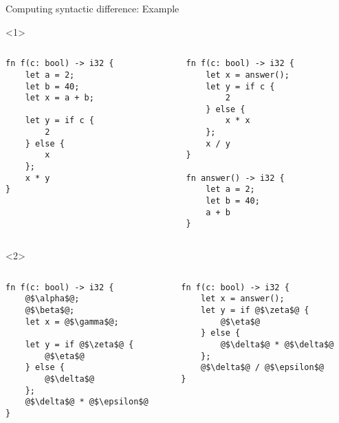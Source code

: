 \documentclass{beamer}
\begin{document}
\begin{frame}[fragile]{Computing syntactic difference: Example}
\newbox\boxsemicolon
\sbox\boxsemicolon{\color{blue}\scriptsize\ttfamily;}

\begin{onlyenv}<1>
\begin{columns}
\begin{column}{0.45\textwidth}
\vspace{0.5em}
\begin{lstlisting}
fn f(c: bool) -> i32 {
    let a = 2;
    let b = 40;
    let x = a + b;

    let y = if c {
        2
    } else {
        x
    };
    x * y
}
\end{lstlisting}
\end{column}
\begin{column}{0.45\textwidth}
\vspace{0.5em}
\begin{lstlisting}[rulecolor=\color{blue!40}]
fn f(c: bool) -> i32 {
    let x = answer();
    let y = if c {
        2
    } else {
        x * x
    };
    x / y
}

fn answer() -> i32 {
    let a = 2;
    let b = 40;
    a + b
}
\end{lstlisting}
\end{column}
\end{columns}
\end{onlyenv}

\begin{onlyenv}<2>
\begin{columns}
\begin{column}{0.45\textwidth}
\vspace{0.5em}
\begin{lstlisting}
fn f(c: bool) -> i32 {
    @$\alpha$@;
    @$\beta$@;
    let x = @$\gamma$@;

    let y = if @$\zeta$@ {
        @$\eta$@
    } else {
        @$\delta$@
    };
    @$\delta$@ * @$\epsilon$@
}
\end{lstlisting}
\end{column}
\begin{column}{0.45\textwidth}
\vspace{0.5em}
\begin{lstlisting}[rulecolor=\color{blue!40}]
fn f(c: bool) -> i32 {
    let x = answer();
    let y = if @$\zeta$@ {
        @$\eta$@
    } else {
        @$\delta$@ * @$\delta$@
    };
    @$\delta$@ / @$\epsilon$@
}


\end{lstlisting}
\end{column}
\end{columns}
\end{onlyenv}
\end{frame}
\end{document}
